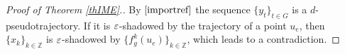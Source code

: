 \begin{proof}[Proof of Theorem \ref{thIME}.]






By $\eqref{importref}$ the sequence $\{y_t\}_{t\in G}$ is a $d$-pseudotrajectory. If it is $\varepsilon$-shadowed by the trajectory of a point $u_e$, then $\{x_k\}_{k\in\mathbb{Z}}$ is $\varepsilon$-shadowed by $\{f_g^k(u_e)\}_{k\in\mathbb{Z}}$, which leads to a contradiction.
\end{proof}






